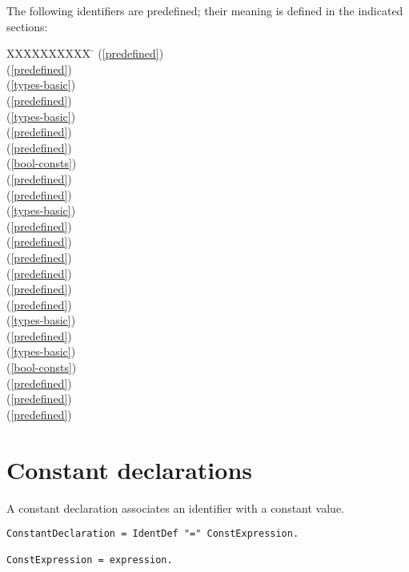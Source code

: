 \documentclass[12pt]{article}
\begin{document}
The following identifiers are predefined; their meaning is defined in the indicated sections:
\begin{tabbing}
    XXXXXXXXXX \= \kill
    \ABS \> (\ref{predefined}) \\
    \ASH \> (\ref{predefined}) \\
    \BOOLEAN \> (\ref{types-basic}) \\
    \CAP \> (\ref{predefined}) \\
    \CHAR \> (\ref{types-basic}) \\
    \COPY \> (\ref{predefined}) \\
    \DEC \> (\ref{predefined}) \\
    \FALSE \> (\ref{bool-consts}) \\
    \HALT \> (\ref{predefined}) \\
    \INC \> (\ref{predefined}) \\
    \INTEGER \> (\ref{types-basic}) \\
    \LEN \> (\ref{predefined}) \\
    \MAX \> (\ref{predefined}) \\
    \MIN \> (\ref{predefined}) \\
    \NEW \> (\ref{predefined}) \\
    \ODD \> (\ref{predefined}) \\
    \ORD \> (\ref{predefined}) \\
    \REAL \> (\ref{types-basic}) \\
    \SIZE \> (\ref{predefined}) \\
    \STRING \> (\ref{types-basic}) \\
    \TRUE \>  (\ref{bool-consts}) \\
    \WriteInt \> (\ref{predefined}) \\
    \WriteBoolean \> (\ref{predefined}) \\
    \WriteLn \> (\ref{predefined}) \\
\end{tabbing}

\section{Constant declarations}

A constant declaration associates an identifier with a constant value.

\begin{lstlisting}[style=ebnf]
ConstantDeclaration = IdentDef "=" ConstExpression. 

ConstExpression = expression.
\end{lstlisting}
\end{document}
